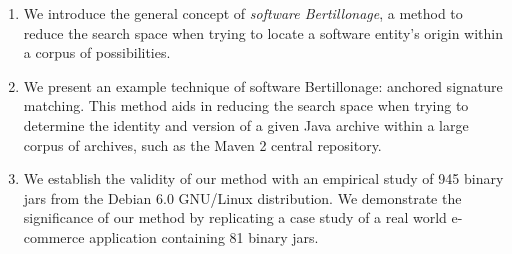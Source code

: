 \begin{enumerate}
\item We introduce the general concept of \emph{software Bertillonage}, a
    method to reduce the search space when trying to locate a software
    entity's origin within a corpus of possibilities.

\vspace{0.7em}
\item We present an example technique of software Bertillonage: anchored
    signature matching.  This method aids in reducing the search space when
    trying to determine the identity and version of a given Java archive
    within a large
    corpus of archives, such as the Maven 2 central repository.

\vspace{0.7em}
\item We establish the validity of our method with an empirical study
    of 945 binary jars from the Debian 6.0 GNU/Linux distribution.
    We demonstrate the significance of our method by replicating
    a case study of a
    real world e-commerce application containing 81 binary jars.

\end{enumerate}

%

%

